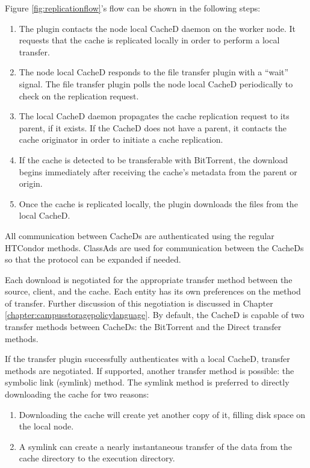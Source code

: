 Figure \ref{fig:replicationflow}'s flow can be shown in the following steps:

\begin{enumerate}
\item The plugin contacts the node local CacheD daemon on the worker node.  It requests that the cache is replicated locally in order to perform a local transfer.
\item The node local CacheD responds to the file transfer plugin with a ``wait'' signal.  The file transfer plugin polls the node local CacheD periodically to check on the replication request.
\item The local CacheD daemon propagates the cache replication request to its parent, if it exists.  If the CacheD does not have a parent, it contacts the cache originator in order to initiate a cache replication.
\item If the cache is detected to be transferable with BitTorrent, the download begins immediately after receiving the cache's metadata from the parent or origin.
\item Once the cache is replicated locally, the plugin downloads the files from the local CacheD.
\end{enumerate}

All communication between CacheDs are authenticated using the regular HTCondor methods.  ClassAds are used for communication between the CacheDs so that the protocol can be expanded if needed. 

Each download is negotiated for the appropriate transfer method between the source, client, and the cache.  Each entity has its own preferences on the method of transfer.   Further discussion of this negotiation is discussed in Chapter \ref{chapter:campusstoragepolicylanguage}.  By default, the CacheD is capable of two transfer methods between CacheDs: the BitTorrent and the Direct transfer methods.  

If the transfer plugin successfully authenticates with a local CacheD, transfer methods are negotiated.  If supported, another transfer method is possible: the symbolic link (symlink) method.  The symlink method is preferred to directly downloading the cache for two reasons:
\begin{enumerate}
	\item Downloading the cache will create yet another copy of it, filling disk space on the local node.
	\item A symlink can create a nearly instantaneous transfer of the data from the cache directory to the execution directory.
\end{enumerate}

